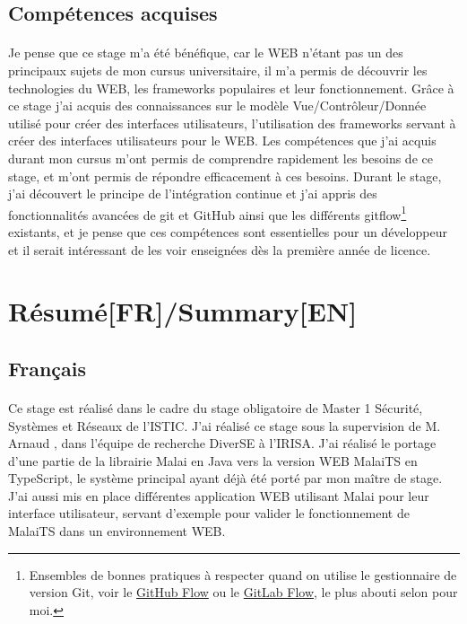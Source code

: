 \documentclass[11pt, a4paper, pdftex]{article}
\begin{document}
        \subsection{Compétences acquises}\label{subsec:compacq}
            \paragraph{}
                Je pense que ce stage m'a été bénéfique, car le WEB n'étant pas un des principaux sujets de mon cursus universitaire, il m'a permis de découvrir les technologies du WEB, les frameworks populaires et leur fonctionnement.
                Grâce à ce stage j'ai acquis des connaissances sur le modèle Vue/Contrôleur/Donnée utilisé pour créer des interfaces utilisateurs, l'utilisation des frameworks servant à créer des interfaces utilisateurs pour le WEB\@.
                Les compétences que j'ai acquis durant mon cursus m'ont permis de comprendre rapidement les besoins de ce stage, et m'ont permis de répondre efficacement à ces besoins.
                Durant le stage, j'ai découvert le principe de l'intégration continue et j'ai appris des fonctionnalités avancées de git et GitHub ainsi que les différents gitflow\footnote{Ensembles de bonnes pratiques à respecter quand on utilise le gestionnaire de version Git, voir le \href{https://guides.github.com/introduction/flow/}{GitHub Flow} ou le \href{https://about.gitlab.com/2014/09/29/gitlab-flow/}{GitLab Flow}, le plus abouti selon pour moi.} existants,
                et je pense que ces compétences sont essentielles pour un développeur et il serait intéressant de les voir enseignées dès la première année de licence.

    \newpage

    \section{Résumé[FR]/Summary[EN]}\label{sec:resume}
        \subsection{Français}\label{subsec:franc}
            \paragraph{}
                Ce stage est réalisé dans le cadre du stage obligatoire de Master 1 Sécurité, Systèmes et Réseaux de l'ISTIC\@.
                J'ai réalisé ce stage sous la supervision de M. Arnaud , dans l'équipe de recherche DiverSE à l'IRISA\@.
                J'ai réalisé le portage d'une partie de la librairie Malai en Java vers la version WEB MalaiTS en TypeScript, le système principal ayant déjà été porté par mon maître de stage.
                J'ai aussi mis en place différentes application WEB utilisant Malai pour leur interface utilisateur, servant d'exemple pour valider le fonctionnement de MalaiTS dans un environnement WEB\@.
\end{document}
